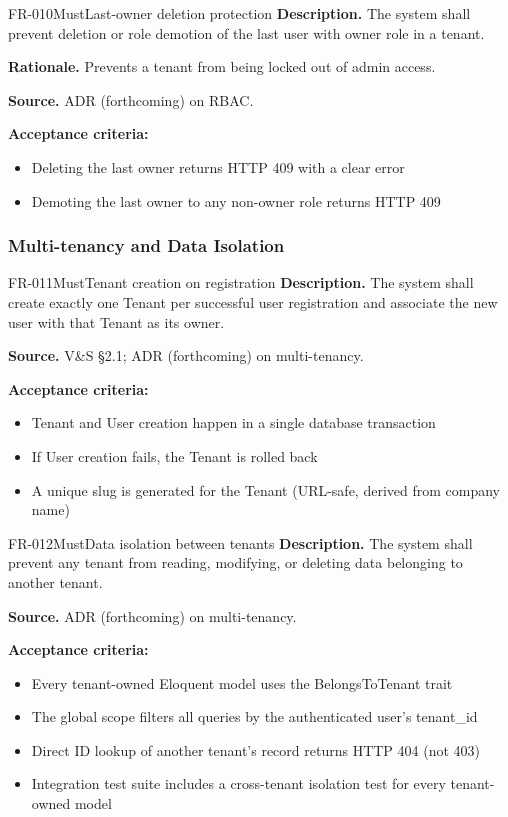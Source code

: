 \documentclass[11pt,a4paper]{article}
\begin{document}
\begin{requirement}{FR-010}{Must}{Last-owner deletion protection}
\textbf{Description.} The system shall prevent deletion or role demotion of the last user with owner role in a tenant.

\textbf{Rationale.} Prevents a tenant from being locked out of admin access.

\textbf{Source.} ADR (forthcoming) on RBAC.

\textbf{Acceptance criteria:}
\begin{itemize}
    \item Deleting the last owner returns HTTP 409 with a clear error
    \item Demoting the last owner to any non-owner role returns HTTP 409
\end{itemize}
\end{requirement}

\subsubsection{Multi-tenancy and Data Isolation}

\begin{requirement}{FR-011}{Must}{Tenant creation on registration}
\textbf{Description.} The system shall create exactly one Tenant per successful user registration and associate the new user with that Tenant as its owner.

\textbf{Source.} V\&S \S2.1; ADR (forthcoming) on multi-tenancy.

\textbf{Acceptance criteria:}
\begin{itemize}
    \item Tenant and User creation happen in a single database transaction
    \item If User creation fails, the Tenant is rolled back
    \item A unique slug is generated for the Tenant (URL-safe, derived from company name)
\end{itemize}
\end{requirement}

\begin{requirement}{FR-012}{Must}{Data isolation between tenants}
\textbf{Description.} The system shall prevent any tenant from reading, modifying, or deleting data belonging to another tenant.

\textbf{Source.} ADR (forthcoming) on multi-tenancy.

\textbf{Acceptance criteria:}
\begin{itemize}
    \item Every tenant-owned Eloquent model uses the BelongsToTenant trait
    \item The global scope filters all queries by the authenticated user's tenant\_id
    \item Direct ID lookup of another tenant's record returns HTTP 404 (not 403)
    \item Integration test suite includes a cross-tenant isolation test for every tenant-owned model
\end{itemize}
\end{requirement}
\end{document}
